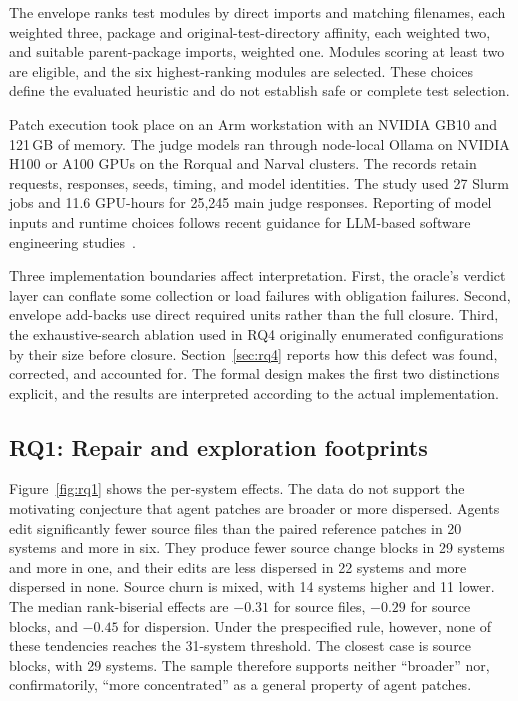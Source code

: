 \documentclass[a4paper,fleqn]{cas-sc}
\begin{document}
The envelope ranks test modules by direct imports and matching filenames, each weighted three, package and original-test-directory affinity, each weighted two, and suitable parent-package imports, weighted one. Modules scoring at least two are eligible, and the six highest-ranking modules are selected. These choices define the evaluated heuristic and do not establish safe or complete test selection.

Patch execution took place on an Arm workstation with an NVIDIA GB10 and 121\,GB of memory. The judge models ran through node-local Ollama on NVIDIA H100 or A100 GPUs on the Rorqual and Narval clusters. The records retain requests, responses, seeds, timing, and model identities. The study used 27 Slurm jobs and 11.6 GPU-hours for 25,245 main judge responses. Reporting of model inputs and runtime choices follows recent guidance for LLM-based software engineering studies~\citep{baltes2027guidelines}.

Three implementation boundaries affect interpretation. First, the oracle's verdict layer can conflate some collection or load failures with obligation failures. Second, envelope add-backs use direct required units rather than the full closure. Third, the exhaustive-search ablation used in RQ4 originally enumerated configurations by their size before closure. Section~\ref{sec:rq4} reports how this defect was found, corrected, and accounted for. The formal design makes the first two distinctions explicit, and the results are interpreted according to the actual implementation.

\subsection{RQ1: Repair and exploration footprints}\label{sec:rq1}

Figure~\ref{fig:rq1} shows the per-system effects. The data do not support the motivating conjecture that agent patches are broader or more dispersed. Agents edit significantly fewer source files than the paired reference patches in 20 systems and more in six. They produce fewer source change blocks in 29 systems and more in one, and their edits are less dispersed in 22 systems and more dispersed in none. Source churn is mixed, with 14 systems higher and 11 lower. The median rank-biserial effects are $-0.31$ for source files, $-0.29$ for source blocks, and $-0.45$ for dispersion. Under the prespecified rule, however, none of these tendencies reaches the 31-system threshold. The closest case is source blocks, with 29 systems. The sample therefore supports neither ``broader'' nor, confirmatorily, ``more concentrated'' as a general property of agent patches.
\end{document}
